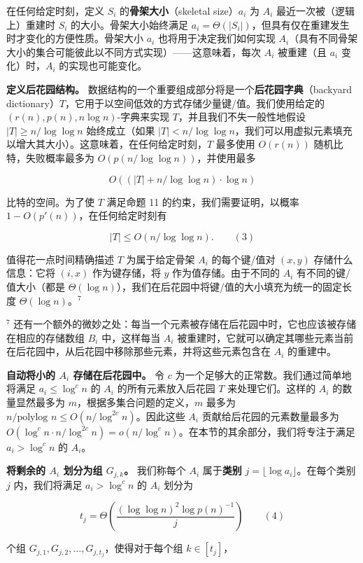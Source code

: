\documentclass[12pt,a4paper]{ctexart}
\theoremstyle{remark}
\begin{document}
在任何给定时刻，定义 $S_i$ 的\textbf{骨架大小}（skeletal size）$a_i$ 为 $A_i$ 最近一次被（逻辑上）重建时 $S_i$ 的大小。骨架大小始终满足 $a_i=\Theta(|S_i|)$，但具有仅在重建发生时才变化的方便性质。骨架大小 $a_i$ 也将用于决定我们如何实现 $A_i$（具有不同骨架大小的集合可能彼此以不同方式实现）——这意味着，每次 $A_i$ 被重建（且 $a_i$ 变化）时，$A_i$ 的实现也可能变化。

\textbf{定义后花园结构。} 数据结构的一个重要组成部分将是一个\textbf{后花园字典}（backyard dictionary）$T$，它用于以空间低效的方式存储少量键/值。我们使用给定的 $(r(n),p(n),n\log n)$-字典来实现 $T$，并且我们不失一般性地假设 $|T|\geq n/\log\log n$ 始终成立（如果 $|T|<n/\log\log n$，我们可以用虚拟元素填充以增大其大小）。这意味着，在任何给定时刻，$T$ 最多使用 $O(r(n))$ 随机比特，失败概率最多为 $O(p(n/\log\log n))$，并使用最多

$$O((|T|+n/\log\log n)\cdot\log n)$$

比特的空间。为了使 $T$ 满足命题 11 的约束，我们需要证明，以概率 $1-O(p'(n))$，在任何给定时刻有

$$|T|\leq O(n/\log\log n).\qquad(3)$$

值得花一点时间精确描述 $T$ 为属于给定骨架 $A_i$ 的每个键/值对 $(x,y)$ 存储什么信息：它将 $(i,x)$ 作为键存储，将 $y$ 作为值存储。由于不同的 $A_i$ 有不同的键/值大小（都是 $\Theta(\log n)$），我们在后花园中将键/值的大小填充为统一的固定长度 $\Theta(\log n)$。$^7$

$^7$ 还有一个额外的微妙之处：每当一个元素被存储在后花园中时，它也应该被存储在相应的存储数组 $B_i$ 中，这样每当 $A_i$ 被重建时，它就可以确定其哪些元素当前在后花园中，从后花园中移除那些元素，并将这些元素包含在 $A_i$ 的重建中。

\textbf{自动将小的 $A_i$ 存储在后花园中。} 令 $c$ 为一个足够大的正常数。我们通过简单地将满足 $a_i\leq\log^c n$ 的 $A_i$ 的所有元素放入后花园 $T$ 来处理它们。这样的 $A_i$ 的数量显然最多为 $m$，根据多集合问题的定义，$m$ 最多为 $n/\text{polylog } n\leq O(n/\log^{2c}n)$。因此这些 $A_i$ 贡献给后花园的元素数量最多为 $O(\log^c n\cdot n/\log^{2c}n)=o(n/\log^c n)$。在本节的其余部分，我们将专注于满足 $a_i>\log^c n$ 的 $A_i$。

\textbf{将剩余的 $A_i$ 划分为组 $G_{j,k}$。} 我们称每个 $A_i$ 属于\textbf{类别} $j=\lfloor\log a_i\rfloor$。在每个类别 $j$ 内，我们将满足 $a_i>\log^c n$ 的 $A_i$ 划分为

$$t_j=\Theta\left(\frac{(\log\log n)^2\log p(n)^{-1}}{j}\right)\qquad(4)$$

个组 $G_{j,1},G_{j,2},\ldots,G_{j,t_j}$，使得对于每个组 $k\in[t_j]$，
\end{document}
